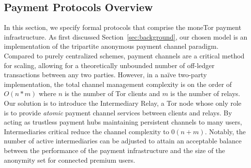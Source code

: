 


\subsection{Payment Protocols Overview}
\label{sec:payment_overview}

In this section, we specify formal protocols that comprise the moneTor payment
infrastructure. As first discussed Section~\ref{sec:background}, our chosen
model is an implementation of the tripartite anonymous payment channel paradigm.
Compared to purely centralized schemes, payment channels are a critical method
for scaling, allowing for a theoretically unbounded number of off-ledger
transactions between any two parties. However, in a na\"{i}ve two-party
implementation, the total channel management complexity is on the order of
$O(n*m)$ where $n$ is the number of Tor clients and $m$ is the number of relays.
Our solution is to introduce the Intermediary Relay, a Tor node whose only role
is to provide \emph{atomic} payment channel services between clients and relays.
By acting as trustless payment hubs maintaining persistent channels to many
users, Intermediaries critical reduce the channel complexity to $0(n+m)$.
Notably, the number of active intermediaries can be adjusted to attain an
acceptable balance between the performance of the payment infrastructure and the
size of the anonymity set for connected premium users.

